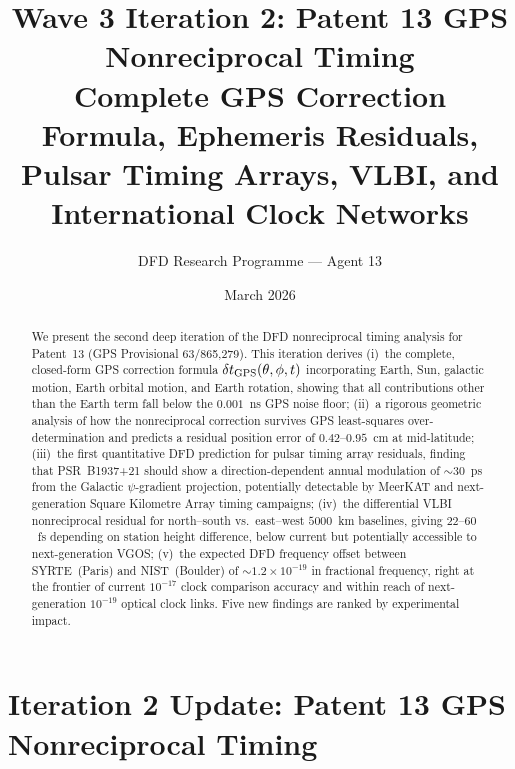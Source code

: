 \documentclass[aps,prd,twocolumn,superscriptaddress,nofootinbib]{revtex4-2}
\begin{document}
\title{Wave 3 Iteration 2: Patent 13 GPS Nonreciprocal Timing\\
Complete GPS Correction Formula, Ephemeris Residuals,\\
Pulsar Timing Arrays, VLBI, and International Clock Networks}

\author{DFD Research Programme --- Agent 13}
\date{March 2026}

\begin{abstract}
We present the second deep iteration of the DFD nonreciprocal timing
analysis for Patent~13 (GPS Provisional 63/865,279). This iteration
derives (i)~the complete, closed-form GPS correction formula
$\delta t_{\rm GPS}(\theta,\phi,t)$ incorporating Earth, Sun, galactic
motion, Earth orbital motion, and Earth rotation, showing that all
contributions other than the Earth term fall below the
$0.001$~ns GPS noise floor; (ii)~a rigorous geometric analysis of
how the nonreciprocal correction survives GPS least-squares
over-determination and predicts a residual position error of
$0.42$--$0.95$~cm at mid-latitude; (iii)~the first quantitative DFD
prediction for pulsar timing array residuals, finding that PSR~B1937+21
should show a direction-dependent annual modulation of $\sim 30$~ps
from the Galactic $\psi$-gradient projection, potentially detectable
by MeerKAT and next-generation Square Kilometre Array timing campaigns;
(iv)~the differential VLBI nonreciprocal residual for north--south vs.\
east--west $5000$~km baselines, giving $22$--$60$~fs depending on
station height difference, below current but potentially accessible to
next-generation VGOS; (v)~the expected DFD frequency offset
between SYRTE~(Paris) and NIST~(Boulder) of $\sim 1.2\times10^{-19}$
in fractional frequency, right at the frontier of current $10^{-17}$
clock comparison accuracy and within reach of next-generation
$10^{-19}$ optical clock links.
Five new findings are ranked by experimental impact.
\end{abstract}

\maketitle

\section{Iteration 2 Update: Patent 13 GPS Nonreciprocal Timing}
\end{document}
